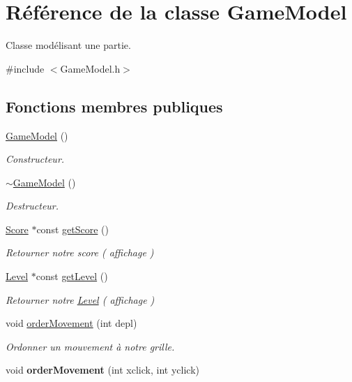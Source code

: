\hypertarget{class_game_model}{\section{Référence de la classe Game\-Model}
\label{class_game_model}
}


Classe modélisant une partie.  




{\ttfamily \#include $<$Game\-Model.\-h$>$}

\subsection*{Fonctions membres publiques}
\begin{DoxyCompactItemize}
\item 
\hyperlink{class_game_model_aa5637be937d4a2ffe81541d513838424}{Game\-Model} ()
\begin{DoxyCompactList}\small\item\em Constructeur. \end{DoxyCompactList}\item 
\hyperlink{class_game_model_ac72de76e47bb6be675de3c49c15ac4af}{$\sim$\-Game\-Model} ()
\begin{DoxyCompactList}\small\item\em Destructeur. \end{DoxyCompactList}\item 
\hyperlink{class_score}{Score} $\ast$const \hyperlink{class_game_model_ab678951d954d7b978be043a045536d08}{get\-Score} ()
\begin{DoxyCompactList}\small\item\em Retourner notre score ( affichage ) \end{DoxyCompactList}\item 
\hyperlink{class_level}{Level} $\ast$const \hyperlink{class_game_model_aa7f4029f9ae959c7a1f07e263d92cccd}{get\-Level} ()
\begin{DoxyCompactList}\small\item\em Retourner notre \hyperlink{class_level}{Level} ( affichage ) \end{DoxyCompactList}\item 
void \hyperlink{class_game_model_aae26e8164a296410e518c1eae486da0a}{order\-Movement} (int depl)
\begin{DoxyCompactList}\small\item\em Ordonner un mouvement à notre grille. \end{DoxyCompactList}\item 
\hypertarget{class_game_model_a835e35b513c8598ea4143a74dcc08be4}{void {\bfseries order\-Movement} (int xclick, int yclick)}\label{class_game_model_a835e35b513c8598ea4143a74dcc08be4}


\end{DoxyCompactItemize}

